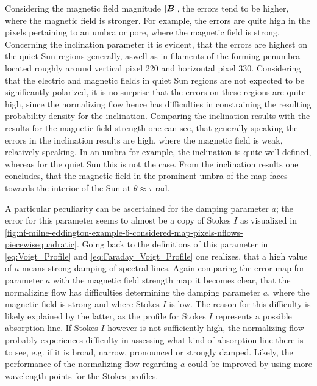 \documentclass[a4paper,12pt]{report}
\def\lk#1{{\color{black}{#1}}}
\begin{document}
Considering the magnetic field magnitude $|\bm{B}|$, the errors tend to be higher, where the magnetic field is stronger. For example, the errors are quite high in the pixels pertaining to an umbra or pore, where the magnetic field is strong. Concerning the inclination parameter it is evident, that the errors are highest on the quiet Sun regions generally, aswell as in filaments of the forming penumbra located roughly around vertical pixel 220 and horizontal pixel 330. Considering that the electric and magnetic fields in quiet Sun regions are not expected to be significantly polarized, it is no surprise that the errors on these regions are quite high, since the normalizing flow hence has difficulties in constraining the resulting probability density for the inclination. Comparing the inclination results with the results for the magnetic field strength one can see, that generally speaking the errors in the inclination results are high, where the magnetic field is weak, relatively speaking. In an umbra for example, the inclination is quite well-defined, whereas for the quiet Sun this is not the case. From the inclination results one concludes, that the magnetic field in the prominent umbra of the map faces towards the interior of the Sun at $\theta \approx \pi\,\si{\radian}$. 

A particular peculiarity can be ascertained for the damping parameter $a$; the error for this parameter seems to almost be a copy of Stokes $I$ as visualized in \cref{fig:nf-milne-eddington-example-6-considered-map-pixels-nflows-piecewisequadratic}. Going back to the definitions of this parameter in \cref{eq:Voigt_Profile} and \cref{eq:Faraday_Voigt_Profile} one realizes, that a high value of $a$ means strong damping of spectral lines. Again comparing the error map for parameter $a$ with the magnetic field strength map it becomes clear, that the normalizing flow has difficulties determining the damping parameter $a$, where the magnetic field is strong and where Stokes $I$ is low. The reason for this difficulty is likely explained by the latter, as the profile for Stokes $I$ represents a possible absorption line. If Stokes $I$ however is not sufficiently high, the normalizing flow probably experiences difficulty in assessing what kind of absorption line there is to see, e.g. if it is broad, narrow, pronounced or strongly damped. Likely, the performance of the normalizing flow regarding \lk{the damping parameter} $a$ could be improved by using more wavelength points for the Stokes profiles.
\end{document}
